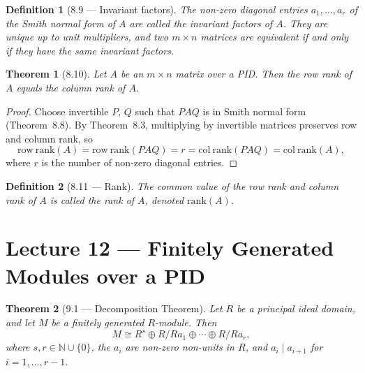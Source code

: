 \documentclass[12pt]{article}
\newtheorem{theorem}{Theorem}
\newtheorem{definition}{Definition}
\begin{document}
\begin{definition}[8.9 — Invariant factors]
The non-zero diagonal entries $a_1, \ldots, a_r$ of the Smith normal form of $A$ are called the \emph{invariant factors} of $A$. They are unique up to unit multipliers, and two $m \times n$ matrices are equivalent if and only if they have the same invariant factors.
\end{definition}

\begin{theorem}[8.10]
Let $A$ be an $m \times n$ matrix over a PID. Then the row rank of $A$ equals the column rank of $A$.
\end{theorem}

\begin{proof}
Choose invertible $P$, $Q$ such that $PAQ$ is in Smith normal form (Theorem~8.8). By Theorem~8.3, multiplying by invertible matrices preserves row and column rank, so
\[
  \mathrm{row\ rank}(A) = \mathrm{row\ rank}(PAQ) = r = \mathrm{col\ rank}(PAQ) = \mathrm{col\ rank}(A),
\]
where $r$ is the number of non-zero diagonal entries.
\end{proof}

\begin{definition}[8.11 — Rank]
The common value of the row rank and column rank of $A$ is called the \emph{rank} of $A$, denoted $\mathrm{rank}(A)$.
\end{definition}

\section*{Lecture 12 — Finitely Generated Modules over a PID}

\begin{theorem}[9.1 — Decomposition Theorem]
Let $R$ be a principal ideal domain, and let $M$ be a finitely generated $R$-module. Then
\[
  M \cong R^s \oplus R/Ra_1 \oplus \cdots \oplus R/Ra_r,
\]
where $s, r \in \mathbb{N} \cup \{0\}$, the $a_i$ are non-zero non-units in $R$, and $a_i \mid a_{i+1}$ for $i = 1, \ldots, r-1$.
\end{theorem}
\end{document}
